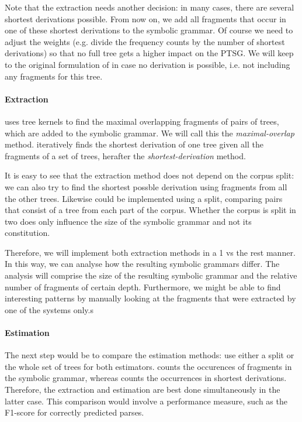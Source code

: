 Note that the \dops{} extraction needs another decision: in many cases, there are several shortest derivations possible. From now on, we add all fragments that occur in one of these shortest derivations to the symbolic grammar. Of course we need to adjust the weights (e.g. divide the frequency counts by the number of shortest derivations) so that no full tree gets a higher impact on the PTSG. We will keep to the original formulation of \dops{} in case no derivation is possible, i.e. not including any fragments for this tree.

\paragraph{Extraction}
\ddop{} uses tree kernels to find the maximal overlapping fragments of pairs of trees, which are added to the symbolic grammar. We will call this the \emph{maximal-overlap} method. \dops{} iteratively finds the shortest derivation of one tree given all the fragments of a set of trees, herafter the \emph{shortest-derivation} method. 

It is easy to see that the \dops{} extraction method does not depend on the corpus split: we can also try to find the shortest possble derivation using fragments from all the other trees. Likewise \ddop{} could be implemented using a split, comparing pairs that consist of a tree from each part of the corpus. Whether the corpus is split in two does only influence the size of the symbolic grammar and not its constitution.

Therefore, we will implement both extraction methods in a 1 vs the rest manner. In this way, we can analyse how the resulting symbolic grammars differ. The analysis will comprise the size of the resulting symbolic grammar and the relative number of fragments of certain depth. Furthermore, we might be able to find interesting patterns by manually looking at the fragments that were extracted by one of the systems only.s

\paragraph{Estimation}
The next step would be to compare the estimation methods: use either a split or the whole set of trees for both estimators. \ddop{} counts the occurences of fragments in the symbolic grammar, whereas \dops{} counts the occurrences in shortest derivations. Therefore, the extraction and estimation are best done simultaneously in the latter case. This comparison would involve a performance measure, such as the F1-score for correctly predicted parses.


